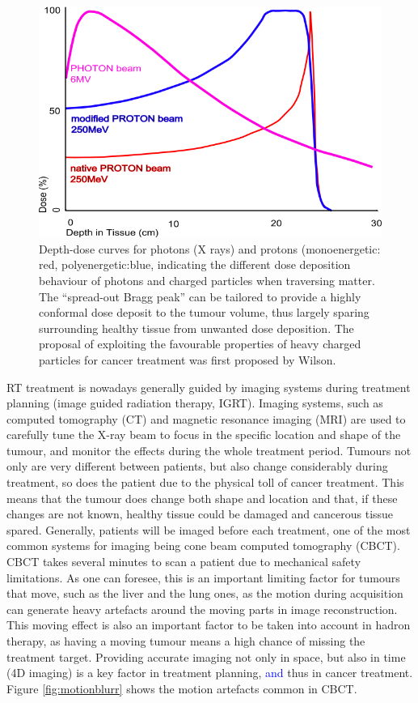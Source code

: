 \begin{figure}[ht]
\begin{center}
\includegraphics[width=0.6\columnwidth]{Introduction/BraggPeak.png}
\caption[Bragg peak]{ Depth-dose curves for photons (X rays) and protons (monoenergetic: red, polyenergetic:blue, indicating the different dose deposition behaviour of photons and charged particles when traversing matter. The ``spread-out Bragg peak'' can be tailored to provide a highly conformal dose deposit to the tumour volume, thus largely sparing surrounding healthy tissue from unwanted dose deposition. The proposal of  exploiting the favourable properties of heavy charged particles for cancer treatment was first proposed by Wilson\cite{wilson1946radiological}.}
\label{fig:bragg}
\end{center}
\end{figure}


RT treatment is nowadays generally guided by imaging systems during treatment planning (image guided radiation therapy, IGRT). Imaging systems, such as computed tomography (CT) and magnetic resonance imaging (MRI) are used to carefully tune the X-ray beam to focus in the specific location and shape of the tumour, and monitor the effects during the whole treatment period. Tumours not only are very different between patients, but also change considerably during treatment, so does the patient due to the physical toll of cancer treatment. This means that the tumour does change both shape and location and that, if these changes are not known, healthy tissue could be damaged and cancerous tissue spared. Generally, patients will be imaged before each treatment,  one of the most common systems for imaging being cone beam computed tomography (CBCT). CBCT takes several minutes to scan a patient due to mechanical safety limitations. As one can foresee, this is an important limiting factor for tumours that move, such as the liver and the lung ones, as the motion during acquisition can generate heavy artefacts around the moving parts in image reconstruction. This moving effect is also an important factor to be taken into account in hadron therapy, as having a moving tumour means a high chance of missing the treatment target. Providing accurate imaging not only in space, but also in time (4D imaging) is a key factor in treatment planning, \textcolor{blue}{and} thus in cancer treatment. Figure \ref{fig:motionblurr} shows the motion artefacts common in CBCT.

